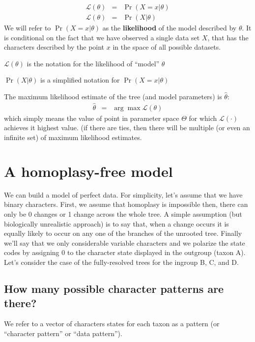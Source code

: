 \documentclass[11pt]{article}
\begin{document}
\begin{eqnarray}
	\mathcal{L}(\theta) & = & \Pr(X=x|\theta)\\
	\mathcal{L}(\theta) & = & \Pr(X|\theta)
\end{eqnarray}
We will refer to $\Pr(X=x|\theta)$ as the {\bf likelihood} of the model described by $\theta$. 
It is conditional on the fact that we have observed a single data set $X$, that has the characters described
by the point $x$ in the space of all possible datasets.
\begin{compactitem}
	\item $\mathcal{L}(\theta)$ is the notation for the likelihood of ``model'' $\theta$
	\item $\Pr(X|\theta)$ is a simplified notation for $\Pr(X=x|\theta)$
\end{compactitem}

The maximum likelihood estimate of the tree (and model parameters) is $\hat{\theta}$:
\begin{eqnarray}
	\hat{\theta} & = & \arg\max \mathcal{L}(\theta)
\end{eqnarray}
which simply means the value of point in parameter space $\Theta$ for which $ \mathcal{L}(\cdot)$ achieves it highest value. (if there are ties, then there will be multiple (or even an infinite set) of maximum likelihood estimates.


\section*{A homoplasy-free model}
We can build a model of perfect data.  
For simplicity, let's assume that we have binary characters.
First, we assume that homoplasy is impossible then, there can only be 0 changes or 1 change across the whole tree.
A simple assumption (but biologically unrealistic approach) is to say that, when a change occurs it is equally likely to occur on any one of the branches of the unrooted tree.
Finally we'll say that we only considerable variable characters and we polarize the state codes by assigning 0
to the character state displayed in the outgroup (taxon A).
Let's consider the case of the fully-resolved trees for the ingroup B, C, and D.


\subsection*{How many possible character patterns are there?}
We refer to a vector of characters states for each taxon as a pattern (or ``character pattern'' or ``data pattern'').
\end{document}
